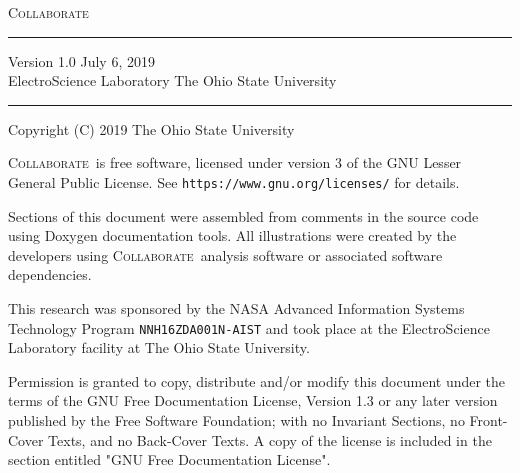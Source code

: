\documentclass[twoside, 12pt]{article}
\newcommand{\+}{\discretionary{\mbox{\scriptsize$\hookleftarrow$}}{}{}}
\newcommand{\project}{\textsc{Collaborate~}}
\begin{document}
\sloppy
\hypersetup{pageanchor=false, bookmarksnumbered=true, pdfencoding=unicode}


\begin{titlepage}
\vspace*{5cm}
{\Huge\project} \\
\noindent\rule{\textwidth}{4pt}
Version 1.0
\hfill
July 6, 2019 \\
\mbox{}
\vfill
{\large ElectroScience Laboratory \hfill The Ohio State University} \\
\noindent\rule{\textwidth}{2pt}
\end{titlepage}



\mbox{}
\vfill

Copyright (C) 2019  The Ohio State University

\project is free software, licensed under version 3 of the GNU Lesser General
Public License. See \texttt{https://www.gnu.org/licenses/} for details.

Sections of this document were assembled from comments in the source code using
Doxygen documentation tools.  All illustrations were created by the developers
using \project analysis software or associated software dependencies.

This research was sponsored by the NASA Advanced Information Systems Technology
Program \texttt{NNH16ZDA001N-AIST} and took place at the ElectroScience
Laboratory facility at The Ohio State University.

Permission is granted to copy, distribute and/or modify this document under the
terms of the GNU Free Documentation License, Version 1.3 or any later version
published by the Free Software Foundation; with no Invariant Sections, no
Front-Cover Texts, and no Back-Cover Texts.  A copy of the license is included
in the section entitled "GNU Free Documentation License".

\newpage


\tableofcontents
\hypersetup{pageanchor=true}

\newpage

\pagestyle{fancy}
\renewcommand{\sectionmark}[1]{\markright{#1}{}}
\renewcommand{\headheight}{15pt}
\fancyhead[LO,RE]{\rightmark}
\fancyhead[LE,RO]{\thepage}
\cfoot{}

\end{document}
